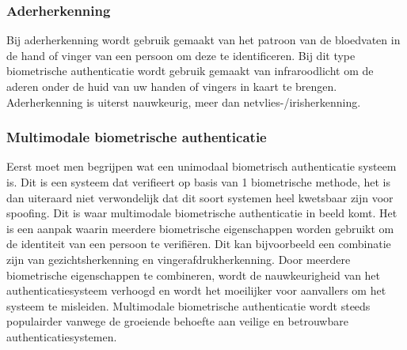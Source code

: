   \subsubsection{Aderherkenning}%
  \label{subsubsec:aderherkenning}
  Bij aderherkenning wordt gebruik gemaakt van het patroon van de bloedvaten in de hand of vinger van een persoon om deze te identificeren. Bij dit type biometrische authenticatie wordt gebruik gemaakt van infraroodlicht om de aderen onder de huid van uw handen of vingers in kaart te brengen. Aderherkenning is uiterst nauwkeurig, meer dan netvlies-/irisherkenning.
  
  \subsubsection{Multimodale biometrische authenticatie}%
  \label{subsubsec:multimodale-biometrische-authenticatie}
  Eerst moet men begrijpen wat een unimodaal biometrisch authenticatie systeem is. Dit is een systeem dat verifieert op basis van 1 biometrische methode, het is dan uiteraard niet verwondelijk dat dit soort systemen heel kwetsbaar zijn voor spoofing.
  \newline
  \newline
  Dit is waar multimodale biometrische authenticatie in beeld komt. Het is een aanpak waarin meerdere biometrische eigenschappen worden gebruikt om de identiteit van een persoon te verifiëren. Dit kan bijvoorbeeld een combinatie zijn van gezichtsherkenning en vingerafdrukherkenning. Door meerdere biometrische eigenschappen te combineren, wordt de nauwkeurigheid van het authenticatiesysteem verhoogd en wordt het moeilijker voor aanvallers om het systeem te misleiden. Multimodale biometrische authenticatie wordt steeds populairder vanwege de groeiende behoefte aan veilige en betrouwbare authenticatiesystemen.
  
